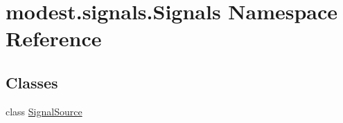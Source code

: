 \hypertarget{namespacemodest_1_1signals_1_1Signals}{}\section{modest.\+signals.\+Signals Namespace Reference}
\label{namespacemodest_1_1signals_1_1Signals}
\subsection*{Classes}
\begin{DoxyCompactItemize}
\item 
class \hyperlink{classmodest_1_1signals_1_1Signals_1_1SignalSource}{Signal\+Source}
\end{DoxyCompactItemize}
